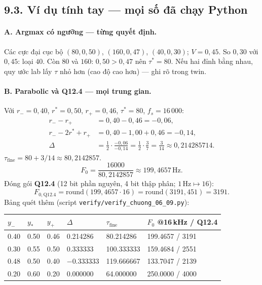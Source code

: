 \subsection*{9.3. Ví dụ tính tay --- mọi số đã chạy Python}

\paragraph{A. Argmax có ngưỡng --- từng quyết định.}
Các cực đại cục bộ $(80,0{,}50)$, $(160,0{,}47)$, $(40,0{,}30)$; $V = 0{,}45$. So $0{,}30$ với $0{,}45$: loại $40$. Còn $80$ và $160$: $0{,}50>0{,}47$ nên $\tau^{*} = 80$. Nếu hai đỉnh bằng nhau, quy ước lab lấy $\tau$ nhỏ hơn (cao độ cao hơn) --- ghi rõ trong twin.

\paragraph{B. Parabolic và Q12.4 --- mọi trung gian.}
Với $r_{-} = 0{,}40$, $r^{*} = 0{,}50$, $r_{+} = 0{,}46$, $\tau^{*} = 80$, $f_s = 16\,000$:
\begin{align*}
r_{-}-r_{+} &= 0{,}40-0{,}46 = -0{,}06,\\
r_{-}-2r^{*}+r_{+} &= 0{,}40-1{,}00+0{,}46 = -0{,}14,\\
\Delta &= \tfrac12\cdot\frac{-0{,}06}{-0{,}14} = \tfrac12\cdot\frac{3}{7} = \frac{3}{14} \approx 0{,}214285714.
\end{align*}
$\tau_{\mathrm{fine}} = 80 + 3/14 \approx 80{,}2142857$.
\[
F_0 = \frac{16000}{80{,}2142857} \approx 199{,}4657\,\text{Hz}.
\]
Đóng gói \textbf{Q12.4} (12 bit phần nguyên, 4 bit thập phân; $1\,\text{Hz}\mapsto 16$):
\[
F_{0,\mathrm{Q12.4}} = \mathrm{round}(199{,}4657\cdot 16) = \mathrm{round}(3191{,}451) = 3191.
\]
Bảng quét thêm (script \texttt{verify/verify\_chuong\_06\_09.py}):

\begin{center}\scriptsize
\begin{tabular}{@{}llllll@{}}\toprule
$y_-$ & $y_*$ & $y_+$ & $\Delta$ & $\tau_{\mathrm{fine}}$ & $F_0$ @16\,kHz / Q12.4 \\
\midrule
0.40 & 0.50 & 0.46 & 0.214286 & 80.214286 & 199.4657 / 3191 \\
0.30 & 0.55 & 0.50 & 0.333333 & 100.333333 & 159.4684 / 2551 \\
0.48 & 0.50 & 0.40 & $-0.333333$ & 119.666667 & 133.7047 / 2139 \\
0.20 & 0.60 & 0.20 & 0.000000 & 64.000000 & 250.0000 / 4000 \\
\bottomrule
\end{tabular}
\end{center}

